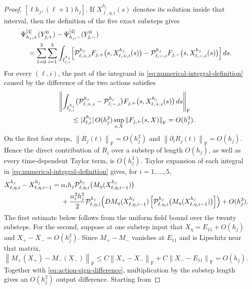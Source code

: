 \documentclass[10pt,a4paper]{amsart}
\numberwithin{equation}{section}
\newcommand{\F}{\mathrm F}
\newcommand{\norm}[1]{\left\lVert #1\right\rVert}
\begin{document}
\begin{proof}
$[\ell h_j,(\ell+1)h_j]$.  If $X^{h_j}_{\ell,\eta,i}(s)$ denotes its solution
inside that interval, then the definition of the five exact substeps gives
\begin{align}
 &\Psi^{[4]}_{h_j,+}(Y_{j,+}^0)-\Psi^{[4]}_{h_j,-}(Y_{j,-}^0)\notag\\
 &\quad=\sum_{\ell=0}^3\sum_{i=1}^5
 \int_{I^{h_j}_{\ell,i}}
 \Bigl[
 \mathcal P^{h_j}_{\ell,+,i}
 F_{j,+}\bigl(s,X^{h_j}_{\ell,+,i}(s)\bigr)
 -\mathcal P^{h_j}_{\ell,-,i}
 F_{j,-}\bigl(s,X^{h_j}_{\ell,-,i}(s)\bigr)
 \Bigr]\,ds.
 \label{eq:numerical-integral-definition}
\end{align}
For every $(\ell,i)$, the part of the integrand in
\eqref{eq:numerical-integral-definition} caused by the difference of
the two actions satisfies
\begin{align}
 &\norm{\int_{I^{h_j}_{\ell,i}}
 \bigl(\mathcal P^{h_j}_{\ell,+,i}
       -\mathcal P^{h_j}_{\ell,-,i}\bigr)
 F_{j,+}\bigl(s,X^{h_j}_{\ell,+,i}(s)\bigr)\,ds}_{\F}
 \notag\\
 &\qquad\le |I^{h_j}_{\ell,i}|\,
 O(h_j^2)\sup_{s,X}\norm{F_{j,+}(s,X)}_{\F}
 =O(h_j^3).
 \label{eq:projector-difference-order}
\end{align}
On the first four steps, $\norm{R_j(t)}_{\F}=O(h_j^2)$ and
$\norm{\partial_tR_j(t)}_{\F}=O(h_j)$.
Hence the direct contribution of $R_j$ over a substep of length
$O(h_j)$, as well as every time-dependent Taylor term, is $O(h_j^3)$.
Taylor expansion of each integral in
\eqref{eq:numerical-integral-definition} gives, for $i=1,\ldots,5$,
\begin{align}
 X^{h_j}_{\ell,\eta,i}-X^{h_j}_{\ell,\eta,i-1}
 ={}&\alpha_i h_j\mathcal P^{h_j}_{\ell,\eta,i}
      \bigl(M_\eta(X^{h_j}_{\ell,\eta,i-1})\bigr)\notag\\
 &+\frac{\alpha_i^2h_j^2}{2}
 \mathcal P^{h_j}_{\ell,\eta,i}\!\left(
 DM_\eta(X^{h_j}_{\ell,\eta,i-1})\left[
 \mathcal P^{h_j}_{\ell,\eta,i}
 \bigl(M_\eta(X^{h_j}_{\ell,\eta,i-1})\bigr)
 \right]\right)
 +O(h_j^3).
 \label{eq:one-substep-taylor}
\end{align}
The first estimate below follows from the uniform field bound over the
twenty substeps.  For the second, suppose at one substep input that
$X_\eta=E_{11}+O(h_j)$ and $X_+-X_-=O(h_j^2)$.
Since $M_+-M_-$ vanishes at $E_{11}$ and is Lipschitz near that matrix,
$\norm{M_+(X_+)-M_-(X_-)}_{\F}
\le C\norm{X_+-X_-}_{\F}+C\norm{X_--E_{11}}_{\F}=O(h_j)$.
Together with \eqref{eq:action-sign-difference}, multiplication by the
substep length gives an $O(h_j^2)$ output difference.  Starting from

\end{proof}
\end{document}

